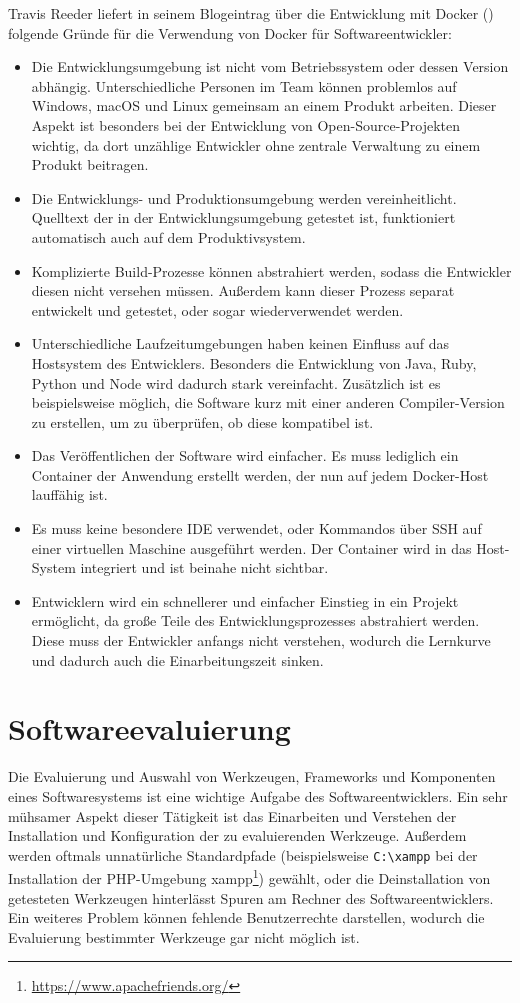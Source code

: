 Travis Reeder liefert in seinem Blogeintrag über die Entwicklung mit Docker (\autocite{why-docker-for-development:online}) folgende Gründe für die Verwendung von Docker für Softwareentwickler:
\begin{itemize}
    \item Die Entwicklungsumgebung ist nicht vom Betriebssystem oder dessen Version abhängig. Unterschiedliche Personen im Team können problemlos auf Windows, macOS und Linux gemeinsam an einem Produkt arbeiten. Dieser Aspekt ist besonders bei der Entwicklung von Open-Source-Projekten wichtig, da dort unzählige Entwickler ohne zentrale Verwaltung zu einem Produkt beitragen.
    \item Die Entwicklungs- und Produktionsumgebung werden vereinheitlicht. Quelltext der in der Entwicklungsumgebung getestet ist, funktioniert automatisch auch auf dem Produktivsystem.
    \item Komplizierte Build-Prozesse können abstrahiert werden, sodass die Entwickler diesen nicht versehen müssen. Außerdem kann dieser Prozess separat entwickelt und getestet, oder sogar wiederverwendet werden.
    \item Unterschiedliche Laufzeitumgebungen haben keinen Einfluss auf das Hostsystem des Entwicklers. Besonders die Entwicklung von Java, Ruby, Python und Node wird dadurch stark vereinfacht. Zusätzlich ist es beispielsweise möglich, die Software kurz mit einer anderen Compiler-Version zu erstellen, um zu überprüfen, ob diese kompatibel ist.
    \item Das Veröffentlichen der Software wird einfacher. Es muss lediglich ein Container der Anwendung erstellt werden, der nun auf jedem Docker-Host lauffähig ist.
    \item Es muss keine besondere IDE verwendet, oder Kommandos über SSH auf einer virtuellen Maschine ausgeführt werden. Der Container wird in das Host-System integriert und ist beinahe nicht sichtbar.
    \item Entwicklern wird ein schnellerer und einfacher Einstieg in ein Projekt ermöglicht, da große Teile des Entwicklungsprozesses abstrahiert werden. Diese muss der Entwickler anfangs nicht verstehen, wodurch die Lernkurve und dadurch auch die Einarbeitungszeit sinken.
\end{itemize}


\section{Softwareevaluierung}
\label{sec:softwareevaluierung}
Die Evaluierung und Auswahl von Werkzeugen, Frameworks und Komponenten eines Softwaresystems ist eine wichtige Aufgabe des Softwareentwicklers.
Ein sehr mühsamer Aspekt dieser Tätigkeit ist das Einarbeiten und Verstehen der Installation und Konfiguration der zu evaluierenden Werkzeuge.
Außerdem werden oftmals unnatürliche Standardpfade (beispielsweise \verb$C:\xampp$ bei der Installation der PHP-Umgebung xampp\footnote{\url{https://www.apachefriends.org/}}) gewählt, oder die Deinstallation von getesteten Werkzeugen hinterlässt Spuren am Rechner des Softwareentwicklers.
Ein weiteres Problem können fehlende Benutzerrechte darstellen, wodurch die Evaluierung bestimmter Werkzeuge gar nicht möglich ist.

